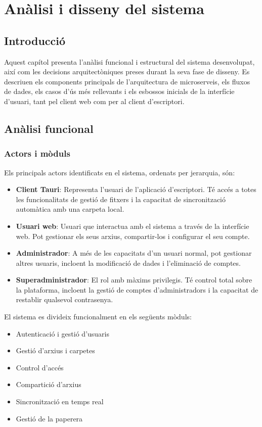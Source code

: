 \chapter{An\`alisi i disseny del sistema}
\label{chap:analisi_disseny}

\section{Introducci\'o}
Aquest cap\'itol presenta l'an\`alisi funcional i estructural del sistema desenvolupat, aix\'i com les decisions arquitect\`oniques preses durant la seva fase de disseny. Es descriuen els components principals de l'arquitectura de microserveis, els fluxos de dades, els casos d'\'us m\'es rellevants i els esbossos inicials de la interf\'icie d'usuari, tant pel client web com per al client d'escriptori.

\section{An\`alisi funcional}

\subsection{Actors i m\`oduls}
Els principals actors identificats en el sistema, ordenats per jerarquia, s\'on:
\begin{itemize}
  \item \textbf{Client Tauri}: Representa l'usuari de l'aplicació d'escriptori. Té accés a totes les funcionalitats de gestió de fitxers i la capacitat de sincronització automàtica amb una carpeta local.
  \item \textbf{Usuari web}: Usuari que interactua amb el sistema a través de la interfície web. Pot gestionar els seus arxius, compartir-los i configurar el seu compte.
  \item \textbf{Administrador}: A més de les capacitats d'un usuari normal, pot gestionar altres usuaris, incloent la modificació de dades i l'eliminació de comptes.
  \item \textbf{Superadministrador}: El rol amb màxims privilegis. Té control total sobre la plataforma, incloent la gestió de comptes d'administradors i la capacitat de restablir qualsevol contrasenya.
\end{itemize}

El sistema es divideix funcionalment en els seg\"uents m\`oduls:
\begin{itemize}
  \item Autenticaci\'o i gesti\'o d'usuaris
  \item Gesti\'o d'arxius i carpetes
  \item Control d'acc\'es
  \item Compartici\'o d'arxius
  \item Sincronitzaci\'o en temps real
  \item Gesti\'o de la paperera
\end{itemize}

